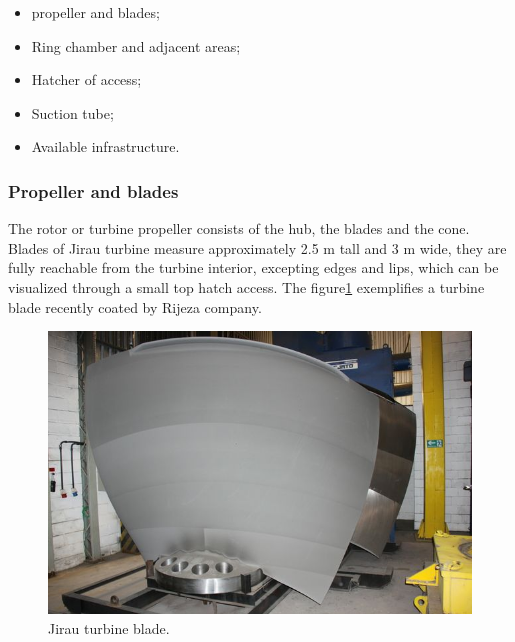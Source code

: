 \begin{itemize}
  \item propeller and blades;
  \item Ring chamber and adjacent areas;
  \item Hatcher of access;
  \item Suction tube;
  \item Available infrastructure.
\end{itemize} 

\subsubsection{Propeller and blades}
 
The rotor or turbine propeller consists of the hub, the blades and the cone.
Blades of Jirau turbine measure approximately 2.5 m tall and
3 m wide, they are fully reachable from the turbine interior,
excepting edges and lips, which can be visualized through a small top hatch
access. The figure\ref{fig::blade_rijeza} exemplifies a turbine blade recently
coated by Rijeza company. 

\begin{figure}[h!]	
	\includegraphics[width=\columnwidth]{figs/viagem/2015_04_28/Rijeza/img_4887}
	\caption{Jirau turbine blade.}
	\label{fig::blade_rijeza}
\end{figure}


